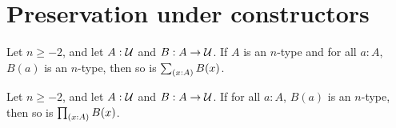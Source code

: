 \documentclass[hott-all.tex]{subfiles}
\begin{document}
\section{Preservation under constructors}
% 
% 
\begin{thm}
 Let $n \geq -2$, and let $A : \mathcal{U}$ and $B : A \to \mathcal{U}$.
 If $A$ is an $n$-type and for all $a : A$, $B(a)$ is an $n$-type, then so is $\sm{x : A} B(x)$.
\end{thm}
% 
% 
% 
% 
% 
\begin{thm}
 Let $n\geq -2$, and let $A : \mathcal{U}$ and $B : A \to \mathcal{U}$.
 If for all $a : A$, $B(a)$ is an $n$-type, then so is $\prd{x : A} B(x)$.
\end{thm}
\end{document}
